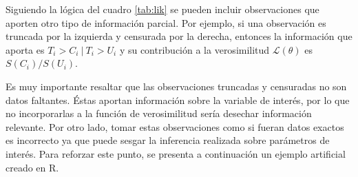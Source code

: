 \documentclass[11pt,a4paper]{article}
\begin{document}
\begin{table}[ht]
\begin{center}
\end{center}
\caption{Contribución de las observaciones a la función de verosimilitud.}
\label{tab:lik}
\end{table}

Siguiendo la lógica del cuadro \ref{tab:lik} se pueden incluir observaciones que aporten otro tipo de información parcial. Por ejemplo, si una observación es truncada por la izquierda y censurada por la derecha, entonces la información que aporta es $T_i>C_i \ | \ T_i > U_i$ y su contribución a la verosimilitud $\mathcal{L}(\theta)$ es $S(C_i)/S(U_i)$.

Es muy importante resaltar que las observaciones truncadas y censuradas no son datos faltantes. Éstas aportan información sobre la variable de interés, por lo que no incorporarlas a la función de verosimilitud sería desechar información relevante. Por otro lado, tomar estas observaciones como si fueran datos exactos es incorrecto ya que puede sesgar la inferencia realizada sobre parámetros de interés. Para reforzar este punto, se presenta a continuación un ejemplo artificial creado en R.
\end{document}
